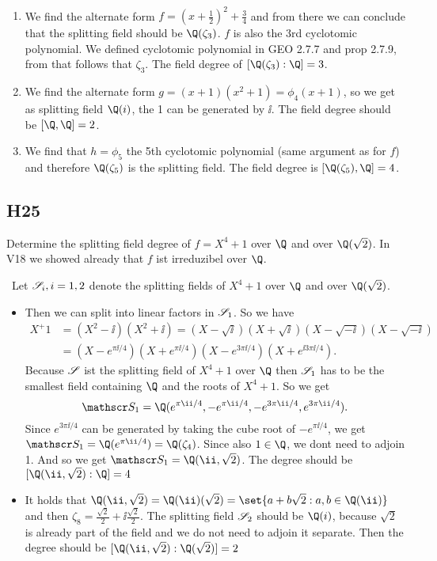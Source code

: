 \begin{solution}\
		\begin{enumerate}
			\item We find the alternate form $f = (x+\frac{1}{2})^2 + \frac{3}{4}$ and from there we can conclude that the 	splitting field should be $\Q(\zeta_3)$. $f$ is also the 3rd cyclotomic polynomial. We defined cyclotomic polynomial in GEO 2.7.7 and prop 2.7.9, from that follows that $\zeta_3$. The field degree of $[\Q(\zeta_3):\Q] = 3$.
			\item We find the alternate form $g = (x+1)(x^2 +1) = \phi_4(x+1)$, so we get as splitting field $\Q(i)$, the 1 can be generated by $\ii$. The field degree should be $[\Q, \Q] = 2$.
			\item We find that $h = \phi_5$ the 5th cyclotomic polynomial (same argument as for $f$) and therefore $\Q(\zeta_5)$ is the splitting field. The field degree is $[\Q(\zeta_5), \Q] = 4$.
		\end{enumerate}
\end{solution}

\subsection{H25}
Determine the splitting field degree of $f = X^4 + 1$ over $\Q$ and over $\Q(\sqrt{2})$. In V18 we showed already that $f$ ist irreduzibel over $\Q$.
\begin{solution}\
	Let $\mathscr S_i, i =1,2$ denote the splitting fields of $X^4 +1$ over $\Q$ and over $\Q(\sqrt{2})$.
	\begin{itemize}
		\item Then we can split into linear factors in $\mathscr S_1$.
		So we have
		\begin{align*}
		X^ +1 &= (X^2 -\ii)(X^2 +\ii) = (X - \sqrt{\ii})(X+ \sqrt{\ii})(X- \sqrt{-\ii})(X- \sqrt{-\ii})\\
		&= (X-e^{\pi\ii /4})(X+e^{\pi\ii /4})(X-e^{3\pi\ii/4})(X+e^{\ii 3\pi\ii/4}).
		\end{align*}
		Because $\mathscr S$ ist the splitting field of $X^4 +1$ over $\Q$ then $\mathscr S_1$ has to be the smallest field containing $\Q$ and the roots of $X^4 +1$. So we get
		\[
		\Split_1 = \Q(e^{\pi\ii /4}, -e^{\pi\ii /4}, -e^{3\pi\ii/4}, e^{3\pi\ii/4}).
		\]
		Since $e^{3\pi\ii/4}$ can be generated by taking the cube root of $-e^{\pi\ii/4}$, we get $\Split_1 = \Q(e^{\pi\ii/4}) = \Q(\zeta_4)$. Since also $1 \in \Q$, we dont need to adjoin 1. And so we get $\Split_1 = \Q(\ii, \sqrt{2})$. The degree should be $[\Q(\ii, \sqrt{2}):\Q] = 4$
		\item It holds that $\Q(\ii, \sqrt{2}) = \Q(\ii)(\sqrt{2}) = \set{a+b\sqrt{2} : a,b \in \Q(\ii)}$ and then $\zeta_8 = \frac{\sqrt{2}}{2}+\ii \frac{\sqrt{2}}{2}$. The splitting field $\mathscr S_2$ should be $\Q(i)$, because $\sqrt{2}$ is already part of the field and we do not need to adjoin it separate. Then the degree should be $[\Q(\ii, \sqrt{2}):\Q(\sqrt{2})] = 2$
	\end{itemize}
\end{solution}